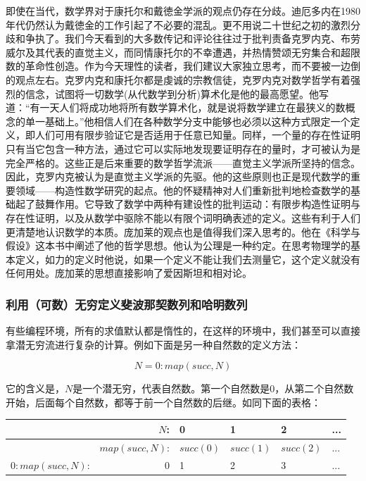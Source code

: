 \documentclass{article}
\begin{document}
即使在当代，数学界对于康托尔和戴徳金学派的观点仍存在分歧。迪厄多内在1980年代仍然认为戴徳金的工作引起了不必要的混乱。更不用说二十世纪之初的激烈分歧和争执了。我们今天看到的大多数传记和评论往往过于批判责备克罗内克、布劳威尔及其代表的直觉主义，而同情康托尔的不幸遭遇，并热情赞颂无穷集合和超限数的革命性创造。作为今天理性的读者，我们建议大家独立思考，而不要被一边倒的观点左右。克罗内克和康托尔都是虔诚的宗教信徒，克罗内克对数学哲学有着强烈的信念，试图将一切数学(从代数学到分析)算术化是他的最高愿望。他写道：“有一天人们将成功地将所有数学算术化，就是说将数学建立在最狭义的数概念的单一基础上。”他相信人们在各种数学分支中能够也必须以这种方式限定一个定义，即人们可用有限步验证它是否适用于任意已知量。同样，一个量的存在性证明只有当它包含一种方法，通过它可以实际地发现要证明存在的量时，才可被认为是完全严格的。这些正是后来重要的数学哲学流派——直觉主义学派所坚持的信念。因此，克罗内克被认为是直觉主义学派的先驱。他的这些原则也正是现代数学的重要领域——构造性数学研究的起点。他的怀疑精神对人们重新批判地检查数学的基础起了鼓舞作用。它导致了数学中两种有建设性的批判运动：有限步构造性证明与存在性证明，以及从数学中驱除不能以有限个词明确表述的定义。这些有利于人们更清楚地认识数学的本质。庞加莱的观点也是值得我们深入思考的。他在《科学与假设》这本书中阐述了他的哲学思想。他认为公理是一种约定。在思考物理学的基本定义，如力的定义时他说，如果一个定义不能让我们去测量它，这个定义就没有任何用处。庞加莱的思想直接影响了爱因斯坦和相对论。

\subsubsection{利用（可数）无穷定义斐波那契数列和哈明数列}

有些编程环境，所有的求值默认都是惰性的，在这样的环境中，我们甚至可以直接拿潜无穷流进行复杂的计算。例如下面是另一种自然数的定义方法：

\[
N = 0 : map(succ, N)
\]

它的含义是，$N$是一个潜无穷，代表自然数。第一个自然数是0，从第二个自然数开始，后面每个自然数，都等于前一个自然数的后继。如同下面的表格：

\begin{tabular}{|r|r|l|l|l|l|}
\hline
                 & $N$: & 0 & 1 & 2 & ... \\
\hline
                 & $map(succ, N)$: & $succ(0)$ & $succ(1)$ & $succ(2)$ & ... \\
\hline
$0 : map(succ, N)$: & 0 & 1 & 2 & 3 & ... \\
\hline
\end{tabular}
\end{document}
